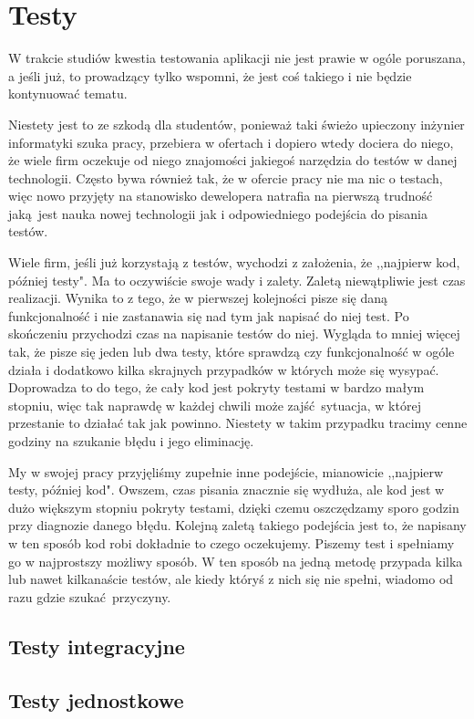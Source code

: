 \section{Testy}
	W trakcie studiów kwestia testowania aplikacji nie jest prawie w ogóle poruszana, a jeśli już, to prowadzący tylko wspomni, że jest coś takiego i nie będzie kontynuować tematu.

	Niestety jest to ze szkodą dla studentów, ponieważ taki świeżo upieczony inżynier informatyki szuka pracy, przebiera w ofertach i dopiero wtedy dociera do niego, że wiele firm oczekuje od niego znajomości jakiegoś narzędzia do testów w danej technologii. Często bywa również tak, że w ofercie pracy nie ma nic o testach, więc nowo przyjęty na stanowisko dewelopera natrafia na pierwszą trudność jaką jest nauka nowej technologii jak i odpowiedniego podejścia do pisania testów.

	Wiele firm, jeśli już korzystają z testów, wychodzi z założenia, że ,,najpierw kod, później testy". Ma to oczywiście swoje wady i zalety. Zaletą niewątpliwie jest czas realizacji. Wynika to z tego, że w pierwszej kolejności pisze się daną funkcjonalność i nie zastanawia się nad tym jak napisać do niej test. Po skończeniu przychodzi czas na napisanie testów do niej. Wygląda to mniej więcej tak, że pisze się jeden lub dwa testy, które sprawdzą czy funkcjonalność w ogóle działa i dodatkowo kilka skrajnych przypadków w których może się wysypać. Doprowadza to do tego, że cały kod jest pokryty testami w bardzo małym stopniu, więc tak naprawdę w każdej chwili może zajść sytuacja, w której przestanie to działać tak jak powinno. Niestety w takim przypadku tracimy cenne godziny na szukanie błędu i jego eliminację.

	My w swojej pracy przyjęliśmy zupełnie inne podejście, mianowicie ,,najpierw testy, później kod". Owszem, czas pisania znacznie się wydłuża, ale kod jest w dużo większym stopniu pokryty testami, dzięki czemu oszczędzamy sporo godzin przy diagnozie danego błędu. Kolejną zaletą takiego podejścia jest to, że napisany w ten sposób kod robi dokładnie to czego oczekujemy. Piszemy test i spełniamy go w najprostszy możliwy sposób. W ten sposób na jedną metodę przypada kilka lub nawet kilkanaście testów, ale kiedy któryś z nich się nie spełni, wiadomo od razu gdzie szukać przyczyny.

	\newpage

  \subsection{Testy integracyjne}
  \subsection{Testy jednostkowe}
